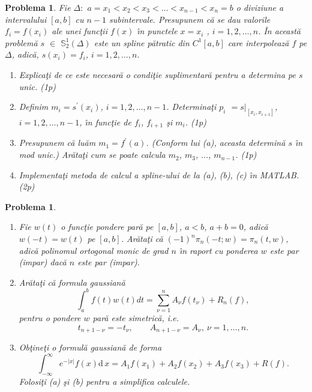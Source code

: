 \documentclass[12pt]{article}%
\newtheorem{problem}[theorem]{Problema}
\begin{document}
\begin{problem}
\label{Gautschip2.73}Fie $\Delta:$ $a=x_{1}<x_{2}<x_{3}<\dots<x_{n-1}<x_{n}=b$
o diviziune a intervalului $[a,b]$ cu $n-1$ subintervale. Presupunem c\u{a} se
dau valorile $f_{i}=f(x_{i})$ ale unei func\c{t}ii $f(x)$ \^{\i}n punctele
$x=x_{i}$ , $i=1,2,\dots,n$. \^{I}n aceast\u{a} problem\u{a} $s$ $\in$
$\mathbb{S}_{2}^{1}(\Delta)$ este un spline p\u{a}tratic din $C^{1}[a,b]$ care
interpoleaz\u{a} $f$ pe $\Delta$, adic\u{a}, $s(x_{i})=f_{i}$, $i=1,2,\dots,n$.

\begin{enumerate}
\item[(a)] Explica\c{t}i de ce este necesar\u{a} o condi\c{t}ie
suplimentar\u{a} pentru a determina pe $s$ unic. (1p)

\item[(b)] Definim $m_{i}=s^{\prime}(x_{i})$, $i=1,2,\dots,n-1$.
Determina\c{t}i $p_{i}$ $=\left.  s\right\vert _{[x_{i},x_{i+1}]}$,
$i=1,2,\dots,n-1$, \^{\i}n func\c{t}ie de $f_{i}$, $f_{i+1}$ \c{s}i $m_{i}$. (1p)

\item[(c)] Presupunem c\u{a} lu\u{a}m $m_{1}=f^{\prime}(a)$. (Conform lui (a),
aceasta determin\u{a} $s$ \^{\i}n mod unic.) Ar\u{a}ta\c{t}i cum se poate
calcula $m_{2}$, $m_{3}$, $\dots$, $m_{n-1}$. (1p)

\item[(d)] Implementa\c{t}i metoda de calcul a spline-ului de la (a), (b), (c)
\^{\i}n MATLAB. (2p)
\end{enumerate}
\end{problem}

\begin{problem}
\label{pb4.37} 

\begin{enumerate}


\item[(a)] Fie $w(t)$ o func\c{t}ie pondere par\u{a} pe $[a,b]$, $a<b$,
$a+b=0$, adic\u{a} $w(-t)=w(t)$ pe $[a,b]$. Ar\u{a}ta\c{t}i c\u{a}
$(-1)^{n}\pi_{n}(-t;w)=\pi_{n}(t,w)$, adic\u{a} polinomul ortogonal monic de
grad $n$ \^{\i}n raport cu ponderea $w$ este par (impar) dac\u{a} $n$ este par (impar).

\item[(b)] Ar\u{a}ta\c{t}i c\u{a} formula gaussian\u{a}
\[
\int_{a}^{b}f(t)w(t)dt=\sum_{\nu=1}^{n}A_{\nu}f(t_{\nu})+R_{n}(f),
\]
pentru o pondere $w$ par\u{a} este simetric\u{a}, i.e.
\[
t_{n+1-\nu}=-t_{\nu},\qquad A_{n+1-\nu}=A_{\nu},~\nu=1,\dots,n.
\]


\item[(c)] Ob\c{t}ine\c{t}i o formul\u{a} gaussian\u{a} de forma%
\[
\int_{-\infty}^{\infty}e^{-|x|}f(x)\mathrm{d}\,x=A_{1}f(x_{1})+A_{2}%
f(x_{2})+A_{3}f(x_{3})+R(f).
\]
Folosi\c{t}i (a) \c{s}i (b) pentru a simplifica calculele. 
\end{enumerate}
\end{problem}
\end{document}
